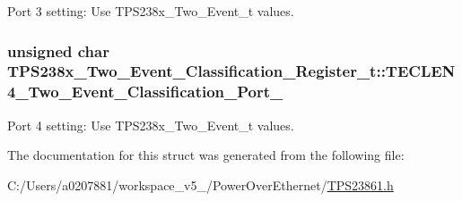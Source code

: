 Port 3 setting\-: Use T\-P\-S238x\-\_\-\-Two\-\_\-\-Event\-\_\-t values. 

\hypertarget{struct_t_p_s238x___two___event___classification___register__t_aa4565fc4362532812b6299028bffea75}{
\subsubsection[{T\-E\-C\-L\-E\-N4\-\_\-\-Two\-\_\-\-Event\-\_\-\-Classification\-\_\-\-Port\-\_\-4}]{\setlength{\rightskip}{0pt plus 5cm}unsigned char T\-P\-S238x\-\_\-\-Two\-\_\-\-Event\-\_\-\-Classification\-\_\-\-Register\-\_\-t\-::\-T\-E\-C\-L\-E\-N4\-\_\-\-Two\-\_\-\-Event\-\_\-\-Classification\-\_\-\-Port\-\_}}\label{struct_t_p_s238x___two___event___classification___register__t_aa4565fc4362532812b6299028bffea75}


Port 4 setting\-: Use T\-P\-S238x\-\_\-\-Two\-\_\-\-Event\-\_\-t values. 



The documentation for this struct was generated from the following file\-:\begin{DoxyCompactItemize}
\item 
C\-:/\-Users/a0207881/workspace\-\_\-v5\-\_/\-Power\-Over\-Ethernet/\hyperlink{_t_p_s23861_8h}{T\-P\-S23861.\-h}\end{DoxyCompactItemize}
